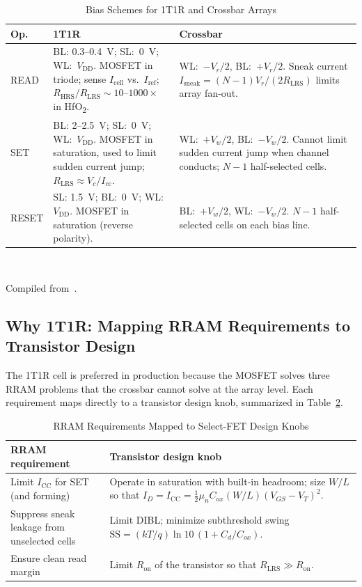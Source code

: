 \documentclass[lettersize,journal]{IEEEtran}
\begin{document}
\begin{table}[!t]
\caption{Bias Schemes for 1T1R and Crossbar Arrays\label{tab:bias}}
\centering
\footnotesize
\renewcommand{\arraystretch}{1.25}
\begin{tabular}{|p{0.42in}|p{1.55in}|p{1.55in}|}
\hline
\textbf{Op.} & \textbf{1T1R} & \textbf{Crossbar} \\
\hline
READ & BL: 0.3--0.4~V; SL:~0~V; WL:~$V_\mathrm{DD}$. MOSFET in triode; sense $I_\mathrm{cell}$ vs.~$I_\mathrm{ref}$; $R_\mathrm{HRS}/R_\mathrm{LRS}\!\sim\!10$--$1000\times$ in HfO\textsubscript{2}. & WL:~$-V_r/2$, BL:~$+V_r/2$. Sneak current $I_\mathrm{sneak}=(N{-}1)V_r/(2R_\mathrm{LRS})$ limits array fan-out. \\
\hline
SET & BL: 2--2.5~V; SL:~0~V; WL:~$V_\mathrm{DD}$. MOSFET in saturation, used to limit sudden current jump; $R_\mathrm{LRS}\!\approx\!V_c/I_\mathrm{cc}$. & WL:~$+V_w/2$, BL:~$-V_w/2$. Cannot limit sudden current jump when channel conducts; $N{-}1$ half-selected cells. \\
\hline
RESET & SL: 1.5~V; BL:~0~V; WL:~$V_\mathrm{DD}$. MOSFET in saturation (reverse polarity). & BL:~$+V_w/2$, WL:~$-V_w/2$. $N{-}1$ half-selected cells on each bias line. \\
\hline
\end{tabular}
\\[2pt]
\raggedright Compiled from~\cite{ref_niu2016,ref_ielmini2016}.
\end{table}

\subsection{Why 1T1R: Mapping RRAM Requirements to Transistor Design}
The 1T1R cell is preferred in production because the MOSFET solves three RRAM problems that the crossbar cannot solve at the array level. Each requirement maps directly to a transistor design knob, summarized in Table~\ref{tab:knobs}.

\begin{table}[!t]
\caption{RRAM Requirements Mapped to Select-FET Design Knobs\label{tab:knobs}}
\centering
\footnotesize
\renewcommand{\arraystretch}{1.2}
\begin{tabular}{|p{1.05in}|p{2.1in}|}
\hline
\textbf{RRAM requirement} & \textbf{Transistor design knob} \\
\hline
Limit $I_\mathrm{CC}$ for SET (and forming) & Operate in saturation with built-in headroom; size $W/L$ so that $I_D = I_\mathrm{CC} = \tfrac{1}{2}\mu_n C_{ox}(W/L)(V_{GS}-V_T)^2$. \\
\hline
Suppress sneak leakage from unselected cells & Limit DIBL; minimize subthreshold swing $\mathrm{SS}=(kT/q)\ln 10\,(1+C_d/C_{ox})$. \\
\hline
Ensure clean read margin & Limit $R_\mathrm{on}$ of the transistor so that $R_\mathrm{LRS}\gg R_\mathrm{on}$. \\
\hline
\end{tabular}
\end{table}
\end{document}

